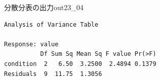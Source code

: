 \begin{Rscreen}{分散分表の出力}{out23_04}
	\begin{verbatim}
Analysis of Variance Table

Response: value
          Df Sum Sq Mean Sq F value Pr(>F)
condition  2   6.50  3.2500  2.4894 0.1379
Residuals  9  11.75  1.3056   
\end{verbatim}
\end{Rscreen}
